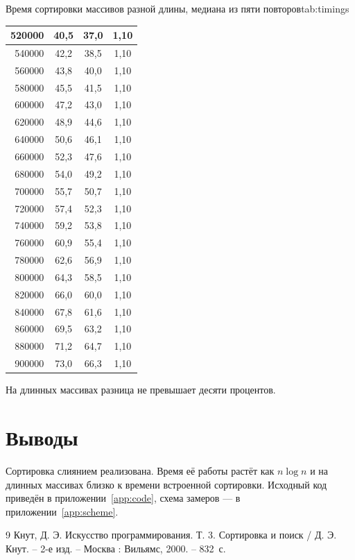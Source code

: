 \documentclass{mtuci-report}
\begin{document}
\begin{bbttable}{Время сортировки массивов разной длины, медиана из пяти
  повторов}{tab:timings}
\begin{tabular}{|r|c|c|c|}
    520000 & 40,5 & 37,0 & 1,10 \\ \hline
    540000 & 42,2 & 38,5 & 1,10 \\ \hline
    560000 & 43,8 & 40,0 & 1,10 \\ \hline
    580000 & 45,5 & 41,5 & 1,10 \\ \hline
    600000 & 47,2 & 43,0 & 1,10 \\ \hline
    620000 & 48,9 & 44,6 & 1,10 \\ \hline
    640000 & 50,6 & 46,1 & 1,10 \\ \hline
    660000 & 52,3 & 47,6 & 1,10 \\ \hline
    680000 & 54,0 & 49,2 & 1,10 \\ \hline
    700000 & 55,7 & 50,7 & 1,10 \\ \hline
    720000 & 57,4 & 52,3 & 1,10 \\ \hline
    740000 & 59,2 & 53,8 & 1,10 \\ \hline
    760000 & 60,9 & 55,4 & 1,10 \\ \hline
    780000 & 62,6 & 56,9 & 1,10 \\ \hline
    800000 & 64,3 & 58,5 & 1,10 \\ \hline
    820000 & 66,0 & 60,0 & 1,10 \\ \hline
    840000 & 67,8 & 61,6 & 1,10 \\ \hline
    860000 & 69,5 & 63,2 & 1,10 \\ \hline
    880000 & 71,2 & 64,7 & 1,10 \\ \hline
    900000 & 73,0 & 66,3 & 1,10 \\ \hline
  \end{tabular}
\end{bbttable}
На длинных массивах разница не превышает десяти процентов.

\section{Выводы}
Сортировка слиянием реализована. Время её работы растёт как $n \log n$ и на длинных
массивах близко к времени встроенной сортировки. Исходный код приведён в
приложении~\ref{app:code}, схема замеров — в приложении~\ref{app:scheme}.

\begin{thebibliography}{9}
   Кнут, Д. Э. Искусство программирования. Т. 3. Сортировка и поиск /
    Д. Э. Кнут. – 2-е изд. – Москва : Вильямс, 2000. – 832~с.
\end{thebibliography}
\end{document}
